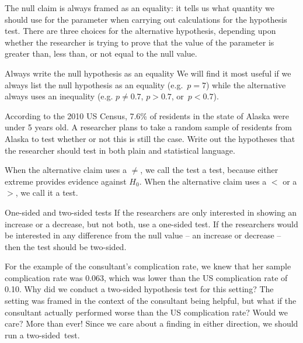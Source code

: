 The null claim is always framed as an equality: it tells us what quantity we should use for the parameter when carrying out calculations for the hypothesis test. There are three choices for the alternative hypothesis, depending upon whether the researcher is trying to prove that the value of the parameter is greater than, less than, or not equal to the null value.

\begin{onebox}{Always write the null hypothesis as an equality}
We will find it most useful if we always list the null hypothesis as an equality (e.g.~$p = 7$) while the alternative always uses an inequality (e.g. $p \neq 0.7$, $p>0.7$, or~$p<0.7$).\end{onebox}

\begin{exercisewrap}
\begin{nexercise}
According to the 2010 US Census, 7.6\% of residents in the state of Alaska were under 5 years old. A researcher plans to take a random sample of residents from Alaska to test whether or not this is still the case. Write out the hypotheses that the researcher should test in both plain and statistical language.\footnotemark
\end{nexercise}
\end{exercisewrap}

When the alternative claim uses a $\neq$, we call the test a  test, because either extreme provides evidence against $H_0$. When the alternative claim uses a $<$ or a $>$, we call it a  test.

\begin{onebox}{One-sided and two-sided tests}
If the researchers are only interested in showing an increase or a decrease, but not both, use a one-sided test. If the researchers would be interested in any difference from the null value -- an increase or decrease -- then the test should be two-sided.\vspace{0.5mm}\end{onebox}

\D{\newpage}

\begin{examplewrap}
\begin{nexample}{For the example of the consultant's complication rate, we knew that her sample complication rate was 0.063, which was lower than the US complication rate of 0.10. Why did we conduct a two-sided hypothesis test for this setting?}
The setting was framed in the context of the consultant being helpful, but what if the consultant actually performed worse than the US complication rate? Would we care? More than ever! Since we care about a finding in either direction, we should run a two-sided~test.
\end{nexample}
\end{examplewrap}

